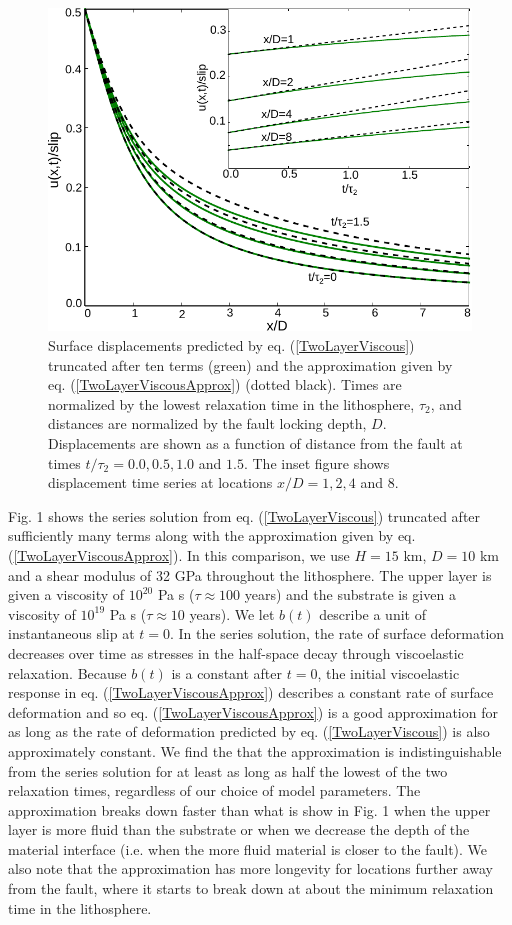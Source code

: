 \begin{figure}\label{figure1}
  \includegraphics{ch2/figures/Fig1.pdf}
  \caption{Surface displacements predicted by
    eq. (\ref{TwoLayerViscous}) truncated after ten terms (green) and
    the approximation given by eq. (\ref{TwoLayerViscousApprox})
    (dotted black).  Times are normalized by the lowest relaxation
    time in the lithosphere, $\tau_2$, and distances are normalized by
    the fault locking depth, $D$.  Displacements are shown as a
    function of distance from the fault at times $t/\tau_2 =
    0.0,0.5,1.0$ and $1.5$. The inset figure shows displacement time
    series at locations $x/D = 1, 2, 4$ and $8$.}
\end{figure} 

Fig. 1 shows the series solution from eq. (\ref{TwoLayerViscous})
truncated after sufficiently many terms along with the approximation
given by eq. (\ref{TwoLayerViscousApprox}). In this comparison, we use
$H=15$ km, $D=10$ km and a shear modulus of 32 GPa throughout the
lithosphere.  The upper layer is given a viscosity of $10^{20}$ Pa s
($\tau\approx 100$ years) and the substrate is given a viscosity of
$10^{19}$ Pa s ($\tau\approx 10$ years).  We let $b(t)$ describe a
unit of instantaneous slip at $t=0$.  In the series solution, the
rate of surface deformation decreases over time as stresses in the
half-space decay through viscoelastic relaxation.  Because $b(t)$ is a
constant after $t=0$, the initial viscoelastic response in
eq. (\ref{TwoLayerViscousApprox}) describes a constant rate of surface
deformation and so eq. (\ref{TwoLayerViscousApprox}) is a good
approximation for as long as the rate of deformation predicted by
eq. (\ref{TwoLayerViscous}) is also approximately constant. We find
the that the approximation is indistinguishable from the series
solution for at least as long as half the lowest of the two relaxation
times, regardless of our choice of model parameters.  The
approximation breaks down faster than what is show in Fig. 1 when
the upper layer is more fluid than the substrate or when we decrease the
depth of the material interface (i.e. when the more fluid material is
closer to the fault).  We also note that the approximation has more
longevity for locations further away from the fault, where it starts
to break down at about the minimum relaxation time in the lithosphere.

